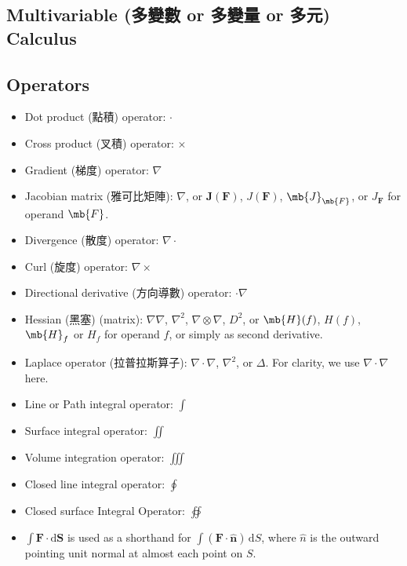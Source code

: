 \documentclass[a4paper,12pt]{report}
\begin{document}
\begin{itemize}
\begin{itemize}
\section{Multivariable (多變數 or 多變量 or 多元) Calculus}
\subsection{Operators}
\begin{itemize}
\item Dot product (點積) operator: $\cdot$
\item Cross product (叉積) operator: $\times$
\item Gradient (梯度) operator: $\nabla$
\item Jacobian matrix (雅可比矩陣): $\nabla$, or $\mathbf{J}(\mathbf{F})$, $J(\mathbf{F})$, $\mb{J}_{\mb{F}}$, or $J_{\mathbf{F}}$ for operand $\mb{F}$.
\item Divergence (散度) operator: $\nabla \cdot$
\item Curl (旋度) operator: $\nabla \times$
\item Directional derivative (方向導數) operator: $\cdot\nabla$
\item Hessian (黑塞) (matrix): $\nabla\nabla$, $\nabla^2$, $\nabla\otimes\nabla$, $D^2$, or $\mb{H}(f)$, $H(f)$, $\mb{H}_f$ or $H_f$ for operand $f$, or simply as second derivative.
\item Laplace operator (拉普拉斯算子): $\nabla\cdot\nabla$, $\nabla^2$, or $\Delta$. For clarity, we use $\nabla\cdot\nabla$ here.
\item Line or Path integral operator: $\int$
\item Surface integral operator: $\iint$
\item Volume integration operator: $\iiint$
\item Closed line integral operator: $\oint$
\item Closed surface Integral Operator: $\oiint$
\item $\int\mathbf{F}\cdot\mathrm{d}\mathbf{S}$ is used as a shorthand for $\int(\mathbf{F}\cdot\mathbf{\hat{n}})\,\mathrm{d}S$, where $\hat{n}$ is the outward pointing unit normal at almost each point on $S$.
\end{itemize}

\end{itemize}
\end{itemize}
\end{document}
